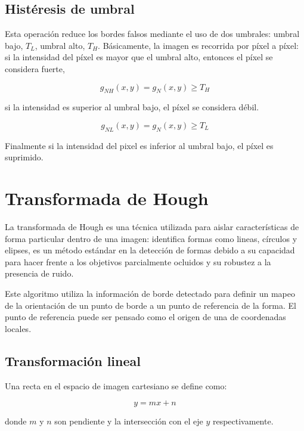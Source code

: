 \subsection{Histéresis de umbral}

Esta operación reduce los bordes falsos mediante el uso de dos umbrales: umbral bajo, $T_L$, umbral alto, $T_H$.
Básicamente, la imagen es recorrida por píxel a píxel: si la intensidad del píxel es mayor que el umbral alto, entonces
el píxel se considera fuerte,

\begin{equation}
g_{NH}(x,y) = g_{N}(x,y)\geq T_H
\end{equation}

si la intensidad es superior al umbral bajo, el píxel se considera débil.  

\begin{equation}
g_{NL}(x,y) = g_{N}(x,y)\geq T_L
\end{equation}

Finalmente si la intensidad del pixel es inferior al umbral bajo, el píxel es suprimido.

\section{Transformada de Hough}


La transformada de Hough es una técnica utilizada para aislar características de forma particular dentro de una imagen:
identifica formas como lineas, círculos y elipses, es un método estándar en la detección de formas debido a su capacidad
para hacer frente a los objetivos parcialmente ocluidos y su robustez a la presencia de ruido\cite{Illingworth1988}.

Este algoritmo utiliza la información de borde detectado para definir un mapeo de la orientación de un punto de borde a
un punto de referencia de la forma. El punto de referencia puede ser pensado como el origen de una de coordenadas locales\cite{Ballard1987}.

\subsection{Transformación lineal}

Una recta en el espacio de imagen cartesiano se define como:

\begin{equation}
y=mx+n
\end{equation}

donde $m$ y $n$ son pendiente y la intersección con el eje $y$ respectivamente. 

